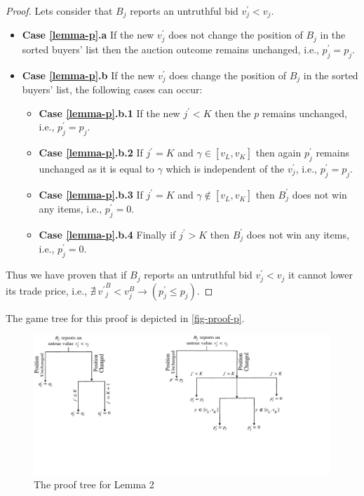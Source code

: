 \begin{proof}
Lets consider that $B_j$ reports an untruthful bid $v^\prime_j < v_j$.
\begin{itemize}
    \item[] \textbf{Case \ref{lemma-p}.a} If the new $v^\prime_j$ does not change the position of $B_j$ in the sorted buyers' list then the auction outcome remains unchanged, i.e., $p^\prime_{j} = p_{j}$.
    \item[] \textbf{Case \ref{lemma-p}.b} If the new $v^\prime_j$ does change the position of $B_j$ in the sorted buyers' list, the following cases can occur:
    \begin{itemize}
    \item[] \textbf{Case \ref{lemma-p}.b.1} If the new $j^\prime < K$ then the $p$ remains unchanged, i.e., $p^\prime_{j} = p_{j}$.
    \item[] \textbf{Case \ref{lemma-p}.b.2} If $j^\prime = K$ and $\gamma \in [{v^{}_L}, {v^{}_K}]$ then again $p^\prime_{j}$ remains unchanged as it is equal to $\gamma$ which is independent of the $v^\prime_j$, i.e., $p^\prime_{j} = p_{j}$.
    \item[] \textbf{Case \ref{lemma-p}.b.3} If $j^\prime = K$ and $\gamma \notin [{v^{}_L} , {v^{}_K}]$ then $B^\prime_j$ does not win any items, i.e., $p^\prime_j=0$.
    \item[] \textbf{Case \ref{lemma-p}.b.4} Finally if $j^\prime > K$ then $B^\prime_j$ does not win any items, i.e., $p^\prime_j=0$.
    \end{itemize}
\end{itemize}
Thus we have proven that if $B_j$ reports an untruthful bid $v^\prime_j < v_j$ it cannot lower its trade price, i.e., $\nexists \ {{v^\prime}^B_{j} < v^B_{j}}\rightarrow ({p^\prime_{j}} \leq p_{j})$.
\end{proof}
The game tree for this proof is depicted in \autoref{fig-proof-p}.
\begin{figure}[htbp]
\centering
\includegraphics{Figures/proofp}
\caption{The proof tree for Lemma 2}
\label{fig-proof-p}
\vspace{-4mm}
\end{figure}
